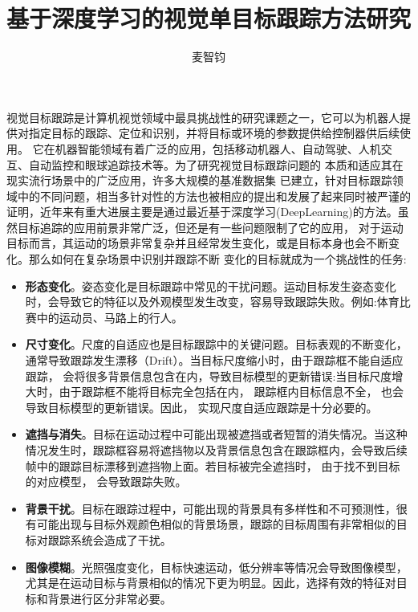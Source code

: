 \documentclass[promaster]{thesis-uestc}
\title{基于深度学习的视觉单目标跟踪方法研究}{The Deep Learning based Sigle Object Tracking Algorithm}
\author{麦智钧}{Mai Zhijun}
\begin{document}
\makecover

\originalitydeclaration

\begin{chineseabstract}
视觉目标跟踪是计算机视觉领域中最具挑战性的研究课题之一，它可以为机器人提供对指定目标的跟踪、定位和识别，并将目标或环境的参数提供给控制器供后续使用。
它在机器智能领域有着广泛的应用，包括移动机器人、自动驾驶、人机交互、自动监控和眼球追踪技术等。为了研究视觉目标跟踪问题的
本质和适应其在现实流行场景中的广泛应用，许多大规模的基准数据集
已建立，针对目标跟踪领域中的不同问题，相当多针对性的方法也被相应的提出和发展了起来同时被严谨的证明，近年来有重大进展主要是通过最近基于深度学习(DeepLearning)的方法。虽然目标追踪的应用前景非常广泛，但还是有一些问题限制了它的应用， 
对于运动目标而言，其运动的场景非常复杂并且经常发生变化，或是目标本身也会不断变化。那么如何在复杂场景中识别并跟踪不断
变化的目标就成为一个挑战性的任务:
\begin{itemize}
    \item \textbf{形态变化}。姿态变化是目标跟踪中常见的干扰问题。运动目标发生姿态变化时，会导致它的特征以及外观模型发生改变，容易导致跟踪失败。例如:体育比赛中的运动员、马路上的行人。
    \item \textbf{尺寸变化}。尺度的自适应也是目标跟踪中的关键问题。目标表观的不断变化，通常导致跟踪发生漂移（Drift）。当目标尺度缩小时，由于跟踪框不能自适应跟踪， 会将很多背景信息包含在内，导致目标模型的更新错误:当目标尺度增大时，由于跟踪框不能将目标完全包括在内， 跟踪框内目标信息不全， 也会导致目标模型的更新错误。因此， 实现尺度自适应跟踪是十分必要的。
    \item \textbf{遮挡与消失}。目标在运动过程中可能出现被遮挡或者短暂的消失情况。当这种情况发生时，跟踪框容易将遮挡物以及背景信息包含在跟踪框内，会导致后续帧中的跟踪目标漂移到遮挡物上面。若目标被完全遮挡时， 由于找不到目标的对应模型， 会导致跟踪失败。
    \item \textbf{背景干扰}。目标在跟踪过程中，可能出现的背景具有多样性和不可预测性，很有可能出现与目标外观颜色相似的背景场景，跟踪的目标周围有非常相似的目标对跟踪系统会造成了干扰。
    \item \textbf{图像模糊}。光照强度变化，目标快速运动，低分辨率等情况会导致图像模型，尤其是在运动目标与背景相似的情况下更为明显。因此，选择有效的特征对目标和背景进行区分非常必要。
\end{itemize}


\end{chineseabstract}
\end{document}
